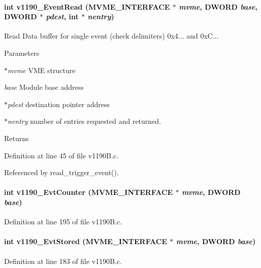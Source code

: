 \paragraph[{v1190\_\-EventRead}]{\setlength{\rightskip}{0pt plus 5cm}int v1190\_\-EventRead ({\bf MVME\_\-INTERFACE} $\ast$ {\em mvme}, \/  {\bf DWORD} {\em base}, \/  {\bf DWORD} $\ast$ {\em pdest}, \/  int $\ast$ {\em nentry})}\hfill\label{v1190B_8h_a2e170ba3dc7d7492affdfad8fbc6338b}
Read Data buffer for single event (check delimiters) 0x4... and 0xC... 
\begin{DoxyParams}{Parameters}
\item[{\em $\ast$mvme}]VME structure \item[{\em base}]Module base address \item[{\em $\ast$pdest}]destination pointer address \item[{\em $\ast$nentry}]number of entries requested and returned. \end{DoxyParams}
\begin{DoxyReturn}{Returns}

\end{DoxyReturn}


Definition at line 45 of file v1190B.c.

Referenced by read\_\-trigger\_\-event().
\paragraph[{v1190\_\-EvtCounter}]{\setlength{\rightskip}{0pt plus 5cm}int v1190\_\-EvtCounter ({\bf MVME\_\-INTERFACE} $\ast$ {\em mvme}, \/  {\bf DWORD} {\em base})}\hfill\label{v1190B_8h_aacf390708ffd7c15a64367d3bfedfe5c}


Definition at line 195 of file v1190B.c.
\paragraph[{v1190\_\-EvtStored}]{\setlength{\rightskip}{0pt plus 5cm}int v1190\_\-EvtStored ({\bf MVME\_\-INTERFACE} $\ast$ {\em mvme}, \/  {\bf DWORD} {\em base})}\hfill\label{v1190B_8h_a2636506cdfe67ff87a209e926069222c}


Definition at line 183 of file v1190B.c.
